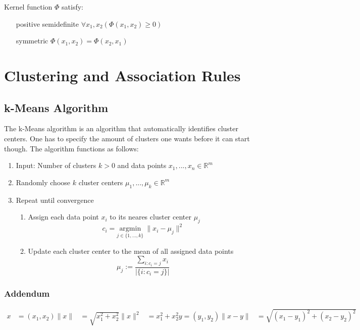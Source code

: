 \documentclass[a4paper, 11pt]{article}
\begin{document}
Kernel function $\Phi$ satisfy:
\begin{enumerate}[leftmargin=*, labelindent=5cm, labelsep=0.5cm]
	\item[positive semidefinite]$\forall x_1,x_2(\Phi(x_1,x_2)\geq 0)$
	\item[symmetric] $\Phi(x_1,x_2) = \Phi(x_2,x_1)$
\end{enumerate}

\section{Clustering and Association Rules}

\subsection{k-Means Algorithm}

The k-Means algorithm is an algorithm that automatically identifies cluster centers. One has to specify the amount of clusters one wants before it can start though. The algorithm functions as follows:

\begin{enumerate}
	\item Input: Number of clusters $k>0$ and data points $x_1,...,x_n \in \mathbb{R}^m$
	\item Randomly choose $k$ cluster centers $\mu_1,...,\mu_k \in \mathbb{R}^m$
	\item Repeat until convergence
	\begin{enumerate}
		\item Assign each data point $x_i$ to its neares cluster center $\mu_j$
		\begin{equation*}
			c_i = \underset{j\in\{1,...,k\}}{\text{argmin}}\ \| x_i - \mu_j \|^2
		\end{equation*}
		\item  Update each cluster center to the mean of all assigned data points
		\begin{equation*}
			\mu_j := \frac{\sum_{i:c_i=j} x_i}{|\{i:c_i = j\}|}
		\end{equation*}
	\end{enumerate}
\end{enumerate}

\subsubsection{Addendum}
\begin{align*}
	x &= (x_1,x_2)
	\| x \| &= \sqrt{x_1^2 + x_2^2}
	\| x \|^2 &= x_1^2 + x_2^2
	y = (y_1, y_2)
	\| x - y \| &= \sqrt{(x_1 - y_1)^2 + (x_2 - y_2)^2}
\end{align*}
\end{document}
